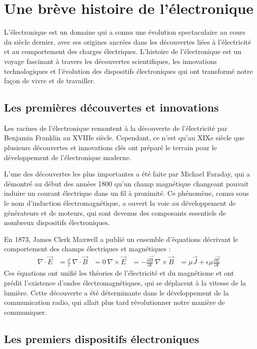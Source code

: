 \section{Une brève histoire de l'électronique}

L'électronique est un domaine qui a connu une évolution spectaculaire au cours du siècle dernier, avec ses origines ancrées dans les découvertes liées à l'électricité et au comportement des charges électriques. L'histoire de l'électronique est un voyage fascinant à travers les découvertes scientifiques, les innovations technologiques et l'évolution des dispositifs électroniques qui ont transformé notre façon de vivre et de travailler.

\subsection{Les premières découvertes et innovations}

Les racines de l'électronique remontent à la découverte de l'électricité par Benjamin Franklin au XVIIIe siècle. Cependant, ce n'est qu'au XIXe siècle que plusieurs découvertes et innovations clés ont préparé le terrain pour le développement de l'électronique moderne.

L'une des découvertes les plus importantes a été faite par Michael Faraday, qui a démontré au début des années 1800 qu'un champ magnétique changeant pouvait induire un courant électrique dans un fil à proximité. Ce phénomène, connu sous le nom d'induction électromagnétique, a ouvert la voie au développement de générateurs et de moteurs, qui sont devenus des composants essentiels de nombreux dispositifs électroniques.

En 1873, James Clerk Maxwell a publié un ensemble d'équations décrivant le comportement des champs électriques et magnétiques :
\begin{align*}
	\nabla \cdot \vec{E} &= \frac{\rho}{\epsilon} \
	\nabla \cdot \vec{B} &= 0 \
	\nabla \times \vec{E} &= -\frac{\partial \vec{B}}{\partial t} \
	\nabla \times \vec{B} &= \mu \vec{J} + \epsilon \mu \frac{\partial \vec{E}}{\partial t}
\end{align*}
Ces équations ont unifié les théories de l'électricité et du magnétisme et ont prédit l'existence d'ondes électromagnétiques, qui se déplacent à la vitesse de la lumière. Cette découverte a été déterminante dans le développement de la communication radio, qui allait plus tard révolutionner notre manière de communiquer.

\subsection{Les premiers dispositifs électroniques}

